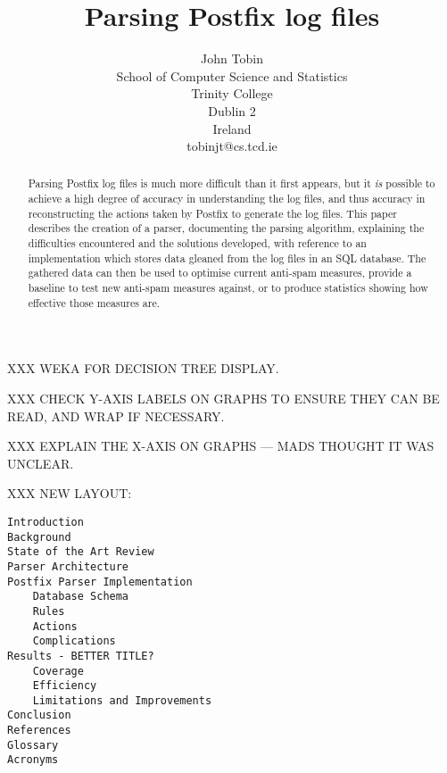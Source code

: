 \documentclass[a4paper,12pt,draft]{article}
\newcounter{dummy}
\begin{document}




\title{Parsing Postfix log files}
\author{John Tobin \\ School of Computer Science and Statistics \\
Trinity College \\ Dublin 2 \\ Ireland \\ tobinjt@cs.tcd.ie}
\maketitle

\begin{abstract}

    Parsing Postfix log files is much more difficult than it first appears,
    but it \textit{is\/} possible to achieve a high degree of accuracy in
    understanding the log files, and thus accuracy in reconstructing the
    actions taken by Postfix to generate the log files.  This paper
    describes the creation of a parser, documenting the parsing algorithm,
    explaining the difficulties encountered and the solutions developed,
    with reference to an implementation which stores data gleaned from the
    log files in an SQL database.  The gathered data can then be used to
    optimise current anti-spam measures, provide a baseline to test new
    anti-spam measures against, or to produce statistics showing how
    effective those measures are.

\end{abstract}

XXX WEKA FOR DECISION TREE DISPLAY\@.

XXX CHECK Y-AXIS LABELS ON GRAPHS TO ENSURE THEY CAN BE READ, AND WRAP IF
NECESSARY\@.

XXX EXPLAIN THE X-AXIS ON GRAPHS --- MADS THOUGHT IT WAS UNCLEAR\@.

\newpage

XXX NEW LAYOUT\@:

\begin{verbatim}
Introduction
Background
State of the Art Review
Parser Architecture
Postfix Parser Implementation
    Database Schema
    Rules
    Actions
    Complications
Results - BETTER TITLE?
    Coverage
    Efficiency
    Limitations and Improvements
Conclusion
References
Glossary
Acronyms
\end{verbatim}
\end{document}
